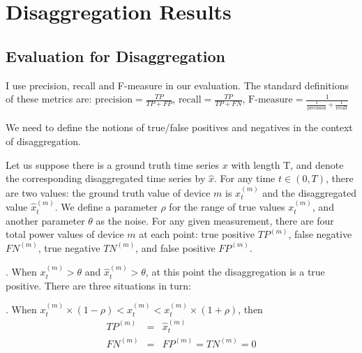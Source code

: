 \section{Disaggregation Results}
\subsection{Evaluation for Disaggregation}
%
%
I use precision, recall and F-measure in our evaluation. The standard
definitions of these metrics are:
$\textrm{precision}=\frac{TP}{TP+FP}$, 
$\textrm{recall}=\frac{TP}{TP+FN}$,
$\textrm{F-measure}=\frac{1}{\frac{1}{\textrm{precision}}+\frac{1}{\textrm{recall}}}$

We need to define the notions of true/false positives
and negatives in the context of disaggregation.

Let us suppose there is a ground truth time series $x$ with length T, 
and denote the corresponding disaggregated time series by $\hat{x}$.
For any time $t \in (0, T)$, there are two values: the
ground truth value of device $m$ is $x_t^{(m)}$ and the disaggregated value
$\hat{x}_t^{(m)}$. We define a parameter $\rho$ for the range of
true values $x_t^{(m)}$, and another parameter $\theta$
as the noise.
For any given measurement, 
there are four total power values %
of device $m$ at
each point: true positive $TP^{(m)}$,  false negative $FN^{(m)}$,
true negative $TN^{(m)}$, and false positive $FP^{(m)}$.

. When $x_t^{(m)} > \theta$ and  $\hat{x}_t^{(m)}> \theta  $,
at this point the disaggregation is a true positive.
There are three situations in turn:

. When $  x_t^{(m)} \times (1-\rho) <  \hat{x}_t^{(m)} <  x_t^{(m)} \times (1+\rho)  $, then
\begin{eqnarray*}
 TP^{(m)} &=& \hat{x}_t^{(m)} \\
 FN^{(m)}&=&FP^{(m)} = TN^{(m)}=0
\end{eqnarray*}

